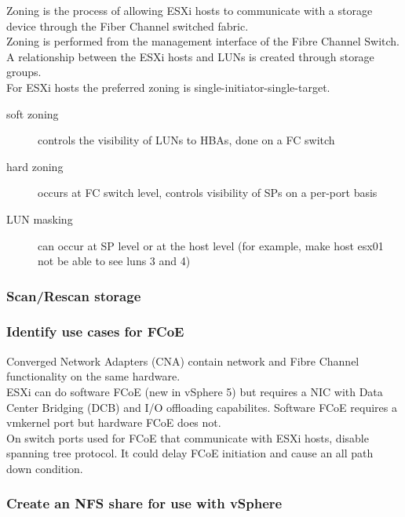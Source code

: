 Zoning is the process of allowing ESXi hosts to communicate with a storage
device through the Fiber Channel switched fabric.\\

Zoning is performed from the management interface of the Fibre Channel Switch.\\

A relationship between the ESXi hosts and LUNs is created through storage
groups.\\

For ESXi hosts the preferred zoning is single-initiator-single-target.

\begin{description}

\item[soft zoning]
controls the visibility of LUNs to HBAs, done on a FC switch

\item[hard zoning]
occurs at FC switch level, controls visibility of SPs on a per-port basis

\item[LUN masking]
can occur at SP level or at the host level (for example, make host esx01 not be
able to see luns 3 and 4)

\end{description}

\subsubsection{Scan/Rescan storage}

\subsubsection{Identify use cases for FCoE}

Converged Network Adapters (CNA) contain network and Fibre Channel
functionality on the same hardware.\\

ESXi can do software FCoE (new in vSphere 5) but requires a NIC with Data
Center Bridging (DCB) and I/O offloading capabilites. Software FCoE requires
a vmkernel port but hardware FCoE does not.\\

On switch ports used for FCoE that communicate with ESXi hosts, disable
spanning tree protocol. It could delay FCoE initiation and cause an all
path down condition.

\subsubsection{Create an NFS share for use with vSphere}

